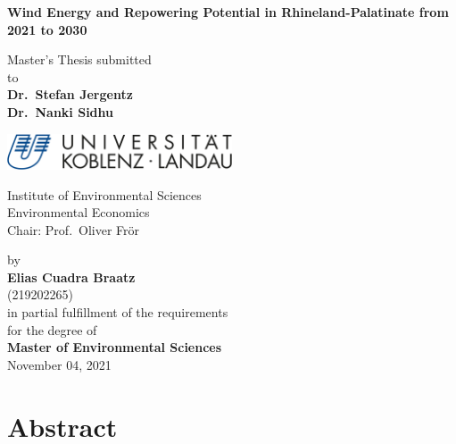 \documentclass[a4paper,11pt]{article}
\begin{document}
\thispagestyle{empty}
\begin{center}
  \vspace*{5mm}
  \linespread{1.5}
  {\huge{\bf Wind Energy and Repowering Potential in Rhineland-Palatinate from 2021 to 2030}\par}\vspace{1cm}
  Master's Thesis submitted \\\vspace{0.5cm}
  to \\\vspace{0.5cm}
  \textbf{Dr.~Stefan Jergentz} \\
  \textbf{Dr.~Nanki Sidhu} \\\vspace{1.5cm}
  
  
  \includegraphics[width=0.5\textwidth]{Uni-Logo-2.jpg}
  
  Institute of Environmental Sciences \\
  Environmental Economics \\
   Chair: Prof.~Oliver Frör \\  \vspace{1cm}

  
  
  by \\\vspace{0.5cm}
  \textbf{Elias Cuadra Braatz} \\
  (219202265) \\
  
  \medskip
  \medskip
  in partial fulfillment of the requirements \\
  for the degree of \\
  \textbf{Master of Environmental Sciences} \\\vspace{0.5cm}
  November 04, 2021
  
\end{center}


\newpage
\tableofcontents
\clearpage

\newpage
\hypertarget{abstract}{%
\section*{Abstract}\label{abstract}}
\end{document}
